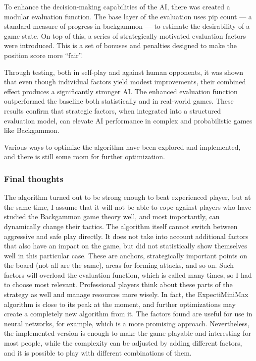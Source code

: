 To enhance the decision-making capabilities of the AI, there was created a modular evaluation function. The base layer of the evaluation uses pip count — a standard measure of progress in backgammon — to estimate the desirability of a game state. On top of this, a series of strategically motivated evaluation factors were introduced. This is a set of bonuses and penalties designed to make the position score more “fair”.

Through testing, both in self-play and against human opponents, it was shown that even though individual factors yield modest improvements, their combined effect produces a significantly stronger AI. The enhanced evaluation function outperformed the baseline both statistically and in real-world games. These results confirm that strategic factors, when integrated into a structured evaluation model, can elevate AI performance in complex and probabilistic games like Backgammon.

Various ways to optimize the algorithm have been explored and implemented, and there is still some room for further optimization.

\subsubsection{Final thoughts}
 The algorithm turned out to be strong enough to beat experienced player, but at the same time, I assume that it will not be able to cope against players who have studied the Backgammon game theory well, and most importantly, can dynamically change their tactics. The algorithm itself cannot switch between aggressive and safe play directly. It does not take into account additional factors that also have an impact on the game, but did not statistically show themselves well in this particular case. These are anchors, strategically important points on the board (not all are the same), areas for forming attacks, and so on. Such factors will overload the evaluation function, which is called many times, so I had to choose most relevant. Professional players think about these parts of the strategy as well and manage resources more wisely. 
In fact, the ExpectiMiniMax algorithm is close to its peak at the moment, and further optimizations may create a completely new algorithm from it. The factors found are useful for use in neural networks, for example, which is a more promising approach. Nevertheless, the implemented version is enough to make the game playable and interesting for most people, while the complexity can be adjusted by adding different factors, and it is possible to play with different combinations of them.